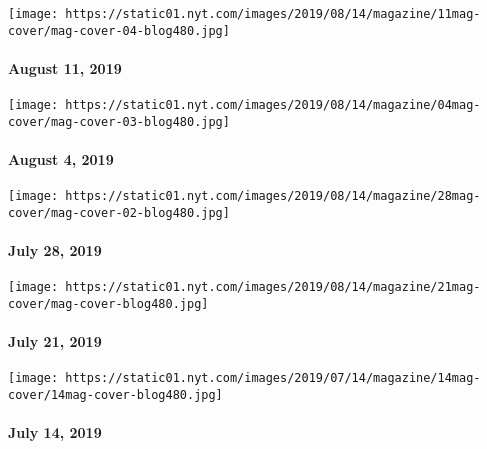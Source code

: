 \href{https://www.nytimes.com/issue/magazine/2019/08/14/the-81119-issue}{}

\texttt{[image: https://static01.nyt.com/images/2019/08/14/magazine/11mag-cover/mag-cover-04-blog480.jpg]}

\hypertarget{august-11-2019}{%
\paragraph{August 11, 2019}\label{august-11-2019}}

\href{https://www.nytimes.com/issue/magazine/2019/08/14/the-8419-issue}{}

\texttt{[image: https://static01.nyt.com/images/2019/08/14/magazine/04mag-cover/mag-cover-03-blog480.jpg]}

\hypertarget{august-4-2019}{%
\paragraph{August 4, 2019}\label{august-4-2019}}

\href{https://www.nytimes.com/issue/magazine/2019/08/14/the-72819-issue}{}

\texttt{[image: https://static01.nyt.com/images/2019/08/14/magazine/28mag-cover/mag-cover-02-blog480.jpg]}

\hypertarget{july-28-2019}{%
\paragraph{July 28, 2019}\label{july-28-2019}}

\href{https://www.nytimes.com/issue/magazine/2019/08/14/the-72119-issue}{}

\texttt{[image: https://static01.nyt.com/images/2019/08/14/magazine/21mag-cover/mag-cover-blog480.jpg]}

\hypertarget{july-21-2019}{%
\paragraph{July 21, 2019}\label{july-21-2019}}

\href{https://www.nytimes.com/issue/magazine/2019/07/11/the-71419-issue}{}

\texttt{[image: https://static01.nyt.com/images/2019/07/14/magazine/14mag-cover/14mag-cover-blog480.jpg]}

\hypertarget{july-14-2019}{%
\paragraph{July 14, 2019}\label{july-14-2019}}

